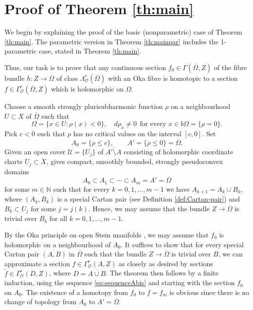 \documentclass[11pt]{amsart}
\numberwithin{equation}{section}
\theoremstyle{definition}
\newcommand\Ucal{\mathcal{U}}
\newcommand\Oscr{\mathscr{O}}
\newcommand\N{\mathbb{N}}
\begin{document}
%
%
%
%
\section{Proof of Theorem \ref{th:main}}\label{sec:proofmain}

We begin by explaining the proof of the basic
(nonparametric) case of Theorem \ref{th:main}.
The parametric version in Theorem \ref{th:mainpar}
includes the 1-parametric case, stated in Theorem \ref{th:main}. 

Thus, our task is to prove that any continuous section 
$f_0\in \Gamma(\overline \Omega,Z)$ of the fibre bundle 
$h:Z\to \overline \Omega$ of class $\Lambda^r_\Oscr(\overline \Omega)$ 
with an Oka fibre is homotopic to a section 
$f\in \Gamma^r_\Oscr(\overline \Omega,Z)$ which is holomorphic
on $\Omega$.

Choose a smooth strongly plurisubharmonic
function $\rho$ on a neighbourhood $U\subset X$ of $\overline\Omega$
such that 
\[
	\Omega=\{x\in U:\rho(x)<0\},\quad  
	d\rho_x\ne 0 \ \ \text{for every $x\in b\Omega =\{\rho=0\}$.}
\]
Pick $c<0$ such that $\rho$ has no critical values on the interval $[c,0]$.
Set 
\[
	A_0=\{\rho\le c\},\qquad 
	A'=\{\rho\le 0\}=\overline \Omega.
\]
Given an open cover $\Ucal=\{U_j\}$ of $\overline{A'\setminus A}$ 
consisting of holomorphic coordinate charts $U_j\subset X$,  
\cite[Lemma 5.10.3]{Forstneric2017E} gives compact, smoothly bounded, 
strongly pseudoconvex domains 
\begin{equation}\label{eq:sequenceAbis}
	A_0 \subset A_1 \subset \cdots \subset A_m=A'=\overline \Omega
\end{equation}
for some $m\in\N$ such that for every $k=0,1,\ldots,m-1$ we have 
$A_{k+1}=A_k\cup B_k$, where $(A_k,B_k)$ is a special Cartan pair
(see Definition \ref{def:Cartan-pair}) and $B_k\subset U_j$ for some $j=j(k)$.  
Hence, we may assume that the bundle $Z\to \overline \Omega$
is trivial over $B_k$ for all $k=0,1,\ldots,m-1$.

By the Oka principle on open Stein manifolds 
\cite[Theorem 5.4.4]{Forstneric2017E}, we may assume that 
$f_0$ is holomorphic on a neighbourhood of $A_0$. 
It suffices to show that for every special 
Cartan pair $(A,B)$ in $\overline \Omega$ such that the bundle
$Z\to \overline \Omega$ is trivial over $B$, 
we can approximate a section $f\in \Gamma^r_{\Oscr}(A,Z)$ as closely 
as desired by sections $\tilde f\in \Gamma^r_{\Oscr}(D,Z)$, 
where $D=A\cup B$. The theorem then follows by a finite induction,
using the sequence \eqref{eq:sequenceAbis} and starting with 
the section $f_0$ on $A_0$. The existence of a homotopy from $f_0$ 
to $f=f_m$ is obvious since there is no change of topology from $A_0$
to $A'=\overline \Omega$.
\end{document}
